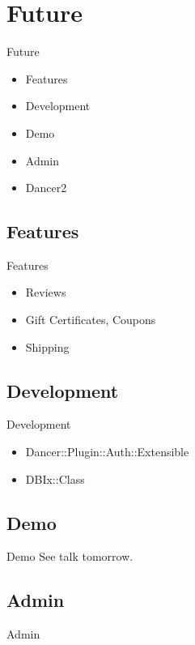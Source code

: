 \section{Future}
\begin{frame}{Future}
\begin{itemize}
\item Features
\item Development
\item Demo
\item Admin
\item Dancer2
\end{itemize}
\end{frame}

\subsection{Features}
\begin{frame}{Features}
\begin{itemize}
\item Reviews
\item Gift Certificates, Coupons
\item Shipping
\end{itemize}
\end{frame}

\subsection{Development}
\begin{frame}{Development}
\begin{itemize}
\item Dancer::Plugin::Auth::Extensible
\item DBIx::Class
\end{itemize}
\end{frame}

\subsection{Demo}
\begin{frame}{Demo}
See talk tomorrow.
\end{frame}

\subsection{Admin}
\begin{frame}{Admin}

\end{frame}


